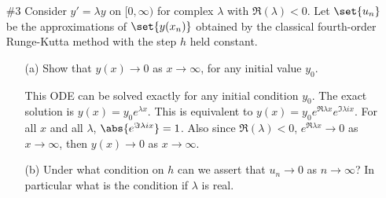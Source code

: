 \documentclass[11pt]{article}
\begin{document}
\begin{enumerate}
    \item[\#3]
        Consider $y' = \lambda y$ on $[0, \infty)$ for complex $\lambda$ with
        $\Re(\lambda) < 0$.
        Let $\set{u_n}$ be the approximations of $\set{y(x_n)}$ obtained by
        the classical fourth-order Runge-Kutta method with the step $h$ held
        constant.
        \begin{enumerate}
            \item[(a)] %
                Show that $y(x) \to 0$ as $x \to \infty$, for any initial
                value $y_0$.

                This ODE can be solved exactly for any initial condition $y_0$.
                The exact solution is $y(x) = y_0 e^{\lambda x}$.
                This is equivalent to $y(x) = y_0 e^{\Re{\lambda}x} e^{\Im{\lambda} i x}$.
                For all $x$ and all $\lambda$, $\abs{e^{\Im{\lambda} i x}} = 1$.
                Also since $\Re(\lambda) < 0$, $e^{\Re{\lambda}x} \to 0$ as $x \to \infty$,
                then $y(x) \to 0$ as $x \to \infty$.

            \item[(b)]
                Under what condition on $h$ can we assert that $u_n \to 0$ as
                $n \to \infty$?
                In particular what is the condition if $\lambda$ is real.


\end{enumerate}
\end{enumerate}
\end{document}
